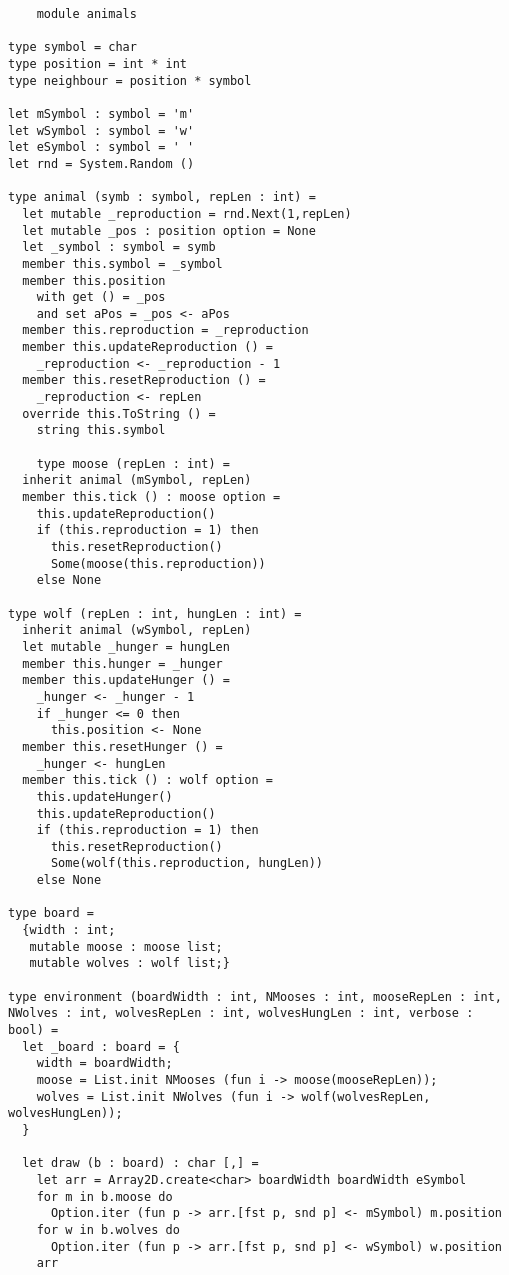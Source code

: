\begin{lstlisting}
    module animals

type symbol = char
type position = int * int
type neighbour = position * symbol

let mSymbol : symbol = 'm'
let wSymbol : symbol = 'w'
let eSymbol : symbol = ' '
let rnd = System.Random ()

type animal (symb : symbol, repLen : int) =
  let mutable _reproduction = rnd.Next(1,repLen)
  let mutable _pos : position option = None
  let _symbol : symbol = symb
  member this.symbol = _symbol
  member this.position
    with get () = _pos
    and set aPos = _pos <- aPos
  member this.reproduction = _reproduction
  member this.updateReproduction () =
    _reproduction <- _reproduction - 1
  member this.resetReproduction () =
    _reproduction <- repLen
  override this.ToString () =
    string this.symbol

    type moose (repLen : int) =
  inherit animal (mSymbol, repLen)
  member this.tick () : moose option =
    this.updateReproduction()
    if (this.reproduction = 1) then
      this.resetReproduction()
      Some(moose(this.reproduction))
    else None

type wolf (repLen : int, hungLen : int) =
  inherit animal (wSymbol, repLen)
  let mutable _hunger = hungLen
  member this.hunger = _hunger
  member this.updateHunger () =
    _hunger <- _hunger - 1
    if _hunger <= 0 then
      this.position <- None
  member this.resetHunger () =
    _hunger <- hungLen
  member this.tick () : wolf option =
    this.updateHunger()
    this.updateReproduction()
    if (this.reproduction = 1) then
      this.resetReproduction()
      Some(wolf(this.reproduction, hungLen))
    else None

type board =
  {width : int;
   mutable moose : moose list;
   mutable wolves : wolf list;}

type environment (boardWidth : int, NMooses : int, mooseRepLen : int, NWolves : int, wolvesRepLen : int, wolvesHungLen : int, verbose : bool) =
  let _board : board = {
    width = boardWidth;
    moose = List.init NMooses (fun i -> moose(mooseRepLen));
    wolves = List.init NWolves (fun i -> wolf(wolvesRepLen, wolvesHungLen));
  }

  let draw (b : board) : char [,] =
    let arr = Array2D.create<char> boardWidth boardWidth eSymbol
    for m in b.moose do
      Option.iter (fun p -> arr.[fst p, snd p] <- mSymbol) m.position
    for w in b.wolves do
      Option.iter (fun p -> arr.[fst p, snd p] <- wSymbol) w.position
    arr


\end{lstlisting}
